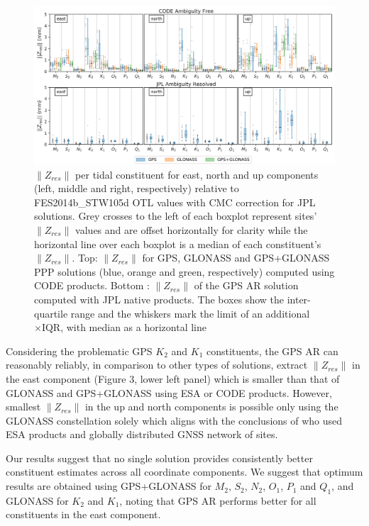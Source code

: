 \documentclass[se, manuscript]{copernicus}
\begin{document}
\begin{figure}[t]
\includegraphics[width=17cm]{fig03.png}
\caption{$\|Z_{res}\|$ per tidal constituent for east, north and up components (left, middle and right, respectively) relative to FES2014b\_STW105d OTL values with CMC correction for JPL solutions. Grey crosses to the left of each boxplot represent sites’ $\|Z_{res}\|$ values and are offset horizontally for clarity while the horizontal line over each boxplot is a median of each constituent’s $\|Z_{res}\|$. Top: $\|Z_{res}\|$ for GPS, GLONASS and GPS+GLONASS PPP solutions (blue, orange and green, respectively) computed using CODE products. Bottom : $\|Z_{res}\|$ of the GPS AR solution computed with JPL native products. The boxes show the inter-quartile range and the whiskers mark the limit of an additional $\times\text{IQR}$, with median as a horizontal line}
\end{figure}

Considering the problematic GPS $K_2$ and $K_1$ constituents, the GPS AR can reasonably reliably, in comparison to other types of solutions, extract $\|Z_{res}\|$ in the east component (Figure 3, lower left panel) which is smaller than that of GLONASS and GPS+GLONASS using ESA or CODE products. However, smallest $\|Z_{res}\|$ in the up and north components is possible only using the GLONASS constellation solely which aligns with the conclusions of \cite{abbaszadeh_benefits_2020} who used ESA products and globally distributed GNSS network of sites.

Our results suggest that no single solution provides consistently better constituent estimates across all coordinate components. We suggest that optimum results are obtained using GPS+GLONASS for $M_2$, $S_2$, $N_2$, $O_1$, $P_1$ and $Q_1$, and GLONASS for $K_2$ and $K_1$, noting that GPS AR performs better for all constituents in the east component.
\end{document}

